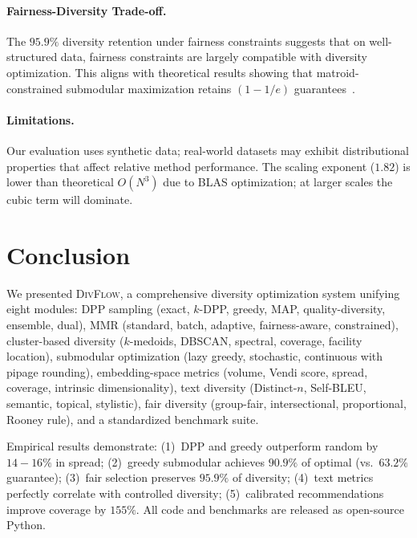 \documentclass[11pt]{article}
\begin{document}
\paragraph{Fairness-Diversity Trade-off.}
The $95.9\%$ diversity retention under fairness constraints suggests that
on well-structured data, fairness constraints are largely compatible with
diversity optimization. This aligns with theoretical results showing that
matroid-constrained submodular maximization retains $(1{-}1/e)$
guarantees~\citep{calinescu2011maximizing}.

\paragraph{Limitations.}
Our evaluation uses synthetic data; real-world datasets may exhibit
distributional properties that affect relative method performance.
The scaling exponent ($1.82$) is lower than theoretical $O(N^3)$ due to
BLAS optimization; at larger scales the cubic term will dominate.

\section{Conclusion}
\label{sec:conclusion}

We presented \textsc{DivFlow}, a comprehensive diversity optimization system
unifying eight modules: DPP sampling (exact, $k$-DPP, greedy, MAP,
quality-diversity, ensemble, dual), MMR (standard, batch, adaptive,
fairness-aware, constrained), cluster-based diversity ($k$-medoids, DBSCAN,
spectral, coverage, facility location), submodular optimization
(lazy greedy, stochastic, continuous with pipage rounding), embedding-space
metrics (volume, Vendi score, spread, coverage, intrinsic dimensionality),
text diversity (Distinct-$n$, Self-BLEU, semantic, topical, stylistic),
fair diversity (group-fair, intersectional, proportional, Rooney rule), and
a standardized benchmark suite.

Empirical results demonstrate: (1)~DPP and greedy outperform random by
$14{-}16\%$ in spread; (2)~greedy submodular achieves $90.9\%$ of optimal
(vs.\ $63.2\%$ guarantee); (3)~fair selection preserves $95.9\%$ of diversity;
(4)~text metrics perfectly correlate with controlled diversity;
(5)~calibrated recommendations improve coverage by $155\%$. All code and
benchmarks are released as open-source Python.
\end{document}
